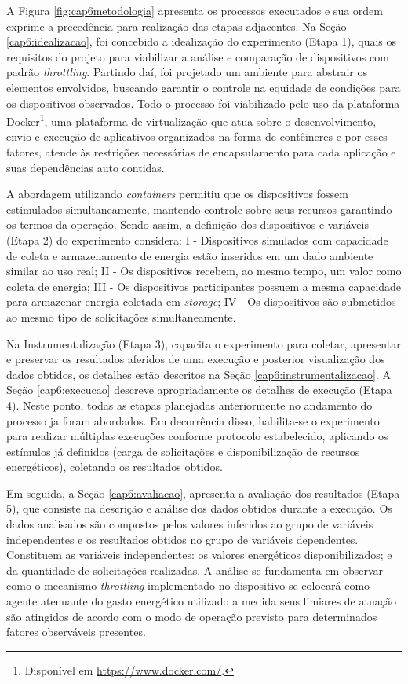 A Figura \ref{fig:cap6metodologia} apresenta os processos executados e sua ordem exprime a precedência para realização das etapas adjacentes. Na Seção \ref{cap6:idealizacao}, foi concebido a idealização do experimento (Etapa 1), quais os requisitos do projeto para viabilizar a análise e comparação de dispositivos com padrão \textit{throttling}. Partindo daí, foi projetado um ambiente para abstrair os elementos envolvidos, buscando garantir o controle na equidade de condições para os dispositivos observados. Todo o processo foi viabilizado pelo uso da plataforma Docker\footnote{Disponível em \url{https://www.docker.com/}.}, uma plataforma de virtualização que atua sobre o desenvolvimento, envio e execução de aplicativos organizados na forma de contêineres e por esses fatores, atende às restrições necessárias de encapsulamento para cada aplicação e suas dependências auto contidas. 

A abordagem utilizando \textit{containers} permitiu que os dispositivos fossem estimulados simultaneamente, mantendo controle sobre seus recursos garantindo os termos da operação. Sendo assim, a definição dos dispositivos e variáveis (Etapa 2) do experimento considera:  I - Dispositivos simulados com capacidade de coleta e armazenamento de energia estão inseridos em um dado ambiente similar ao uso real; II - Os dispositivos recebem, ao mesmo tempo, um valor como coleta de energia; III - Os dispositivos participantes possuem a mesma capacidade para armazenar energia coletada em \textit{storage}; IV - Os dispositivos são submetidos ao mesmo tipo de solicitações simultaneamente.

Na Instrumentalização (Etapa 3), capacita o experimento para coletar, apresentar e preservar os resultados aferidos de uma execução e posterior visualização dos dados obtidos, os detalhes estão descritos na Seção \ref{cap6:instrumentalizacao}. A Seção \ref{cap6:execucao} descreve apropriadamente os detalhes de execução (Etapa 4). Neste ponto, todas as etapas planejadas anteriormente no andamento do processo ja foram abordados. Em decorrência disso, habilita-se o experimento para realizar múltiplas execuções conforme protocolo estabelecido, aplicando os estímulos já definidos (carga de solicitações e disponibilização de recursos energéticos),  coletando os resultados obtidos.

Em seguida, a Seção \ref{cap6:avaliacao}, apresenta a avaliação dos resultados (Etapa 5), que consiste na descrição e análise dos dados obtidos durante a execução. Os dados analisados são compostos pelos valores inferidos ao grupo de variáveis independentes e os resultados obtidos no grupo de variáveis dependentes. Constituem as variáveis independentes: os valores energéticos disponibilizados; e da quantidade de solicitações realizadas. A análise se fundamenta em observar como o mecanismo \textit{throttling} implementado no dispositivo se colocará como agente atenuante do gasto energético utilizado a medida seus limiares de atuação são atingidos de acordo com o modo de operação previsto para determinados fatores observáveis presentes.


